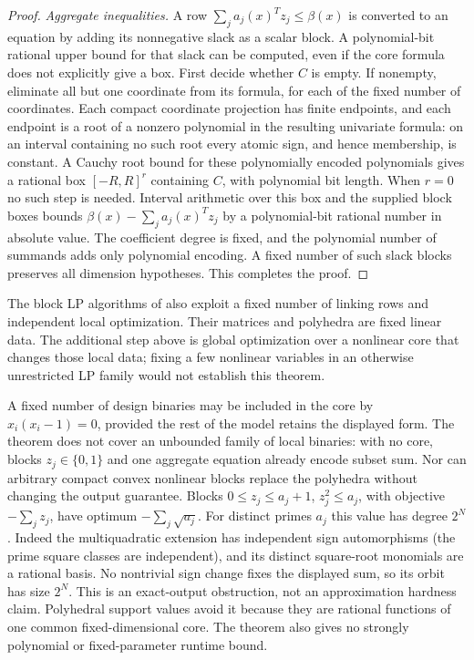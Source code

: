 \begin{proof}
\emph{Aggregate inequalities.}
A row $\sum_j a_j(x)^Tz_j\le\beta(x)$ is converted to an equation by
adding its nonnegative slack as a scalar block. A polynomial-bit
rational upper bound for that slack can be computed, even if the core
formula does not explicitly give a box. First decide whether $C$ is
empty. If nonempty, eliminate all but one coordinate from its formula,
for each of the fixed number of coordinates. Each compact coordinate
projection has finite endpoints, and each endpoint is a root of a
nonzero polynomial in the resulting univariate formula: on an interval
containing no such root every atomic sign, and hence membership, is
constant. A Cauchy root bound for these polynomially encoded
polynomials gives a rational box $[-R,R]^r$ containing $C$, with
polynomial bit length. When $r=0$ no such step is needed. Interval
arithmetic over this box and the supplied block boxes bounds
$\beta(x)-\sum_j a_j(x)^Tz_j$ by a polynomial-bit rational number in
absolute value. The coefficient degree is fixed, and the polynomial
number of summands adds only polynomial encoding. A fixed number of
such slack blocks preserves all dimension hypotheses. This completes
the proof.
\end{proof}

The block LP algorithms of
\citet[Theorem~1]{s4:cslovjecsek2021} also exploit a fixed number of
linking rows and independent local optimization. Their matrices and
polyhedra are fixed linear data. The additional step above is global
optimization over a nonlinear core that changes those local data;
fixing a few nonlinear variables in an otherwise unrestricted LP
family would not establish this theorem.

\begin{remark}\label{s4:core-limits}
A fixed number of design binaries may be included in the core by
$x_i(x_i-1)=0$, provided the rest of the model retains the displayed
form. The theorem does not cover an unbounded family of local binaries:
with no core, blocks $z_j\in\{0,1\}$ and one aggregate equation already
encode subset sum. Nor can arbitrary compact convex nonlinear blocks
replace the polyhedra without changing the output guarantee. Blocks
$0\le z_j\le a_j+1$, $z_j^2\le a_j$, with objective $-\sum_jz_j$,
have optimum $-\sum_j\sqrt{a_j}$. For distinct primes $a_j$ this value
has degree $2^N$. Indeed the multiquadratic extension has independent
sign automorphisms (the prime square classes are independent), and
its distinct square-root monomials are a rational basis. No nontrivial
sign change fixes the displayed sum, so its orbit has size $2^N$.
This is an exact-output obstruction, not an approximation hardness
claim. Polyhedral support values avoid it because they are rational
functions of one common fixed-dimensional core. The theorem also gives
no strongly polynomial or fixed-parameter runtime bound.
\end{remark}

